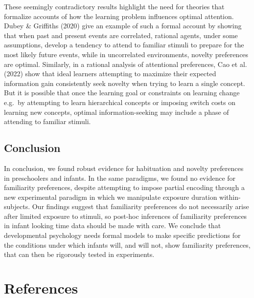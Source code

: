 \documentclass[10pt, letterpaper]{article}
\begin{document}
These seemingly contradictory results highlight the need for theories
that formalize accounts of how the learning problem influences optimal
attention. Dubey \& Griffiths (2020) give an example of such a formal
account by showing that when past and present events are correlated,
rational agents, under some assumptions, develop a tendency to attend to
familiar stimuli to prepare for the most likely future events, while in
uncorrelated environments, novelty preferences are optimal. Similarly,
in a rational analysis of attentional preferences, Cao et al. (2022)
show that ideal learners attempting to maximize their expected
information gain consistently seek novelty when trying to learn a single
concept. But it is possible that once the learning goal or constraints
on learning change e.g.~by attempting to learn hierarchical concepts or
imposing switch costs on learning new concepts, optimal
information-seeking may include a phase of attending to familiar
stimuli.

\hypertarget{conclusion}{%
\subsection{Conclusion}\label{conclusion}}

In conclusion, we found robust evidence for habituation and novelty
preferences in preschoolers and infants. In the same paradigms, we found
no evidence for familiarity preferences, despite attempting to impose
partial encoding through a new experimental paradigm in which we
manipulate exposure duration within-subjects. Our findings suggest that
familiarity preferences do not necessarily arise after limited exposure
to stimuli, so post-hoc inferences of familiarity preferences in infant
looking time data should be made with care. We conclude that
developmental psychology needs formal models to make specific
predictions for the conditions under which infants will, and will not,
show familiarity preferences, that can then be rigorously tested in
experiments.

\hypertarget{references}{%
\section{References}\label{references}}

\setlength{\parindent}{-0.1in} 
\setlength{\leftskip}{0.125in}

\noindent
\end{document}
